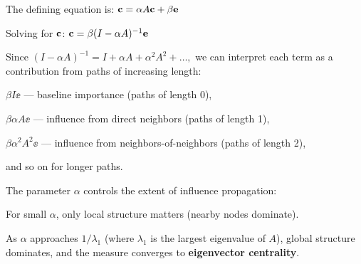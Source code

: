 The defining equation is:
$
\mathbf{c} = \alpha A \mathbf{c} + \beta \mathbf{e}
$

Solving for $\mathbf{c}$:
$
\mathbf{c} = \beta (I - \alpha A)^{-1} \mathbf{e}
$

Since
$
(I - \alpha A)^{-1} = I + \alpha A + \alpha^2 A^2 + \dots,
$
we can interpret each term as a contribution from paths of increasing length:

\begin{tightitemize}
    \item $\beta I \ee$ — baseline importance (paths of length 0),
    \item $\beta \alpha A \ee$ — influence from direct neighbors (paths of length 1),
    \item $\beta \alpha^2 A^2 \ee$ — influence from neighbors-of-neighbors (paths of length 2),
    \item and so on for longer paths.
\end{tightitemize}

\noindent
The parameter $\alpha$ controls the extent of influence propagation:
\begin{tightitemize}
    \item For small $\alpha$, only local structure matters (nearby nodes dominate).
    \item As $\alpha$ approaches $1 / \lambda_1$ (where $\lambda_1$ is the largest eigenvalue of $A$), global structure dominates, and the measure converges to \textbf{eigenvector centrality}.
\end{tightitemize}